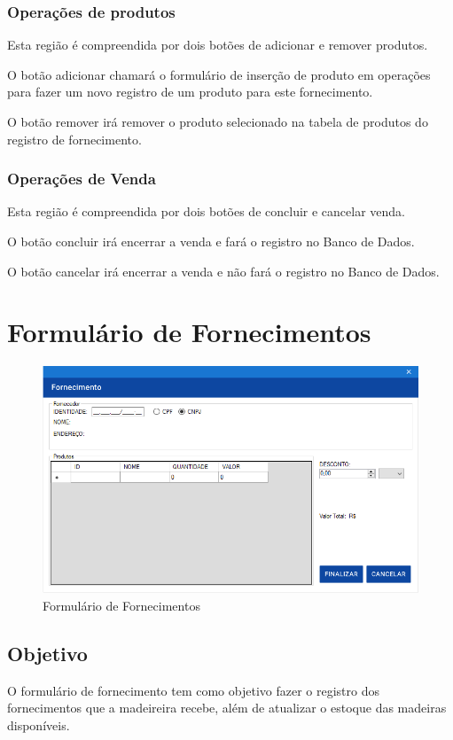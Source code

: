 \documentclass[
	article,			%
	12pt,				%
	oneside,			%
	a4paper,			%
	english,			%
	brazil,				%
	sumario=tradicional
	]{abntex2}
\begin{document}
			\subsubsection{Operações de produtos}
			Esta região é compreendida por dois botões de adicionar e remover produtos.
			
			O botão adicionar chamará o formulário de inserção de produto em operações para fazer um novo registro de um produto para este fornecimento.
			
			O botão remover irá remover o produto selecionado na tabela de produtos do registro de fornecimento.
			\subsubsection{Operações de Venda}
			Esta região é compreendida por dois botões de concluir e cancelar venda.
			
			O botão concluir irá encerrar a venda e fará o registro no Banco de Dados.
			
			O botão cancelar irá encerrar a venda e não fará o registro no Banco de Dados.
	\newpage
	\section{Formulário de Fornecimentos}
		\begin{figure}[!htb]
			\centering
			\includegraphics[scale=0.7]{./Figuras/FrmFornecimento.png}
			\caption{Formulário de Fornecimentos}
		\end{figure}
		\subsection{Objetivo}
		O formulário de fornecimento tem como objetivo fazer o registro dos fornecimentos que a madeireira recebe, além de atualizar o estoque das madeiras disponíveis.  
\end{document}

